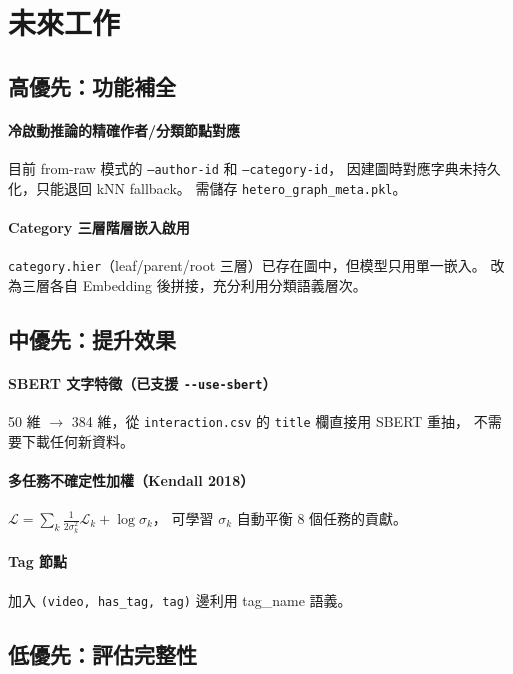 \documentclass[12pt, a4paper]{article}
\begin{document}
\section{未來工作}
\label{sec:future}

\subsection*{高優先：功能補全}

\paragraph{冷啟動推論的精確作者/分類節點對應}
目前 from-raw 模式的 \texttt{--author-id} 和 \texttt{--category-id}，
因建圖時對應字典未持久化，只能退回 kNN fallback。
需儲存 \texttt{hetero\_graph\_\allowbreak{}meta.pkl}。

\paragraph{Category 三層階層嵌入啟用}
\texttt{category.hier}（leaf/parent/root 三層）已存在圖中，但模型只用單一嵌入。
改為三層各自 Embedding 後拼接，充分利用分類語義層次。

\subsection*{中優先：提升效果}

\paragraph{SBERT 文字特徵（已支援 \texttt{-{}-use-sbert}）}
50 維 $\to$ 384 維，從 \texttt{interaction.csv} 的 \texttt{title} 欄直接用 SBERT 重抽，
不需要下載任何新資料。

\paragraph{多任務不確定性加權（Kendall 2018）}
$\mathcal{L} = \sum_k \frac{1}{2\sigma_k^2}\mathcal{L}_k + \log\sigma_k$，
可學習 $\sigma_k$ 自動平衡 8 個任務的貢獻。

\paragraph{Tag 節點}
加入 \texttt{(video, has\_tag, tag)} 邊利用 tag\_name 語義。

\subsection*{低優先：評估完整性}
\end{document}
